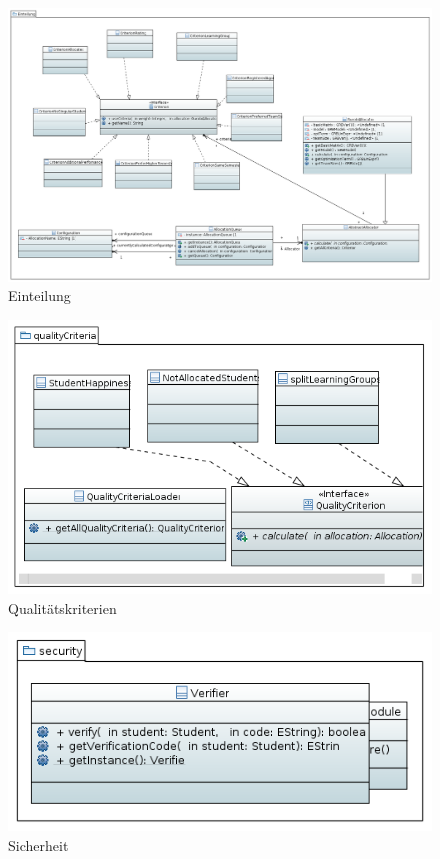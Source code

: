 \documentclass[parskip=full]{scrartcl}
\begin{document}
\begin{figure}
\centering
\includegraphics[width=\linewidth]{bilder/einteilung.png}
\caption{Einteilung}
\label{uml:allocation}
\end{figure}

\begin{figure}[!htb]
\centering
\includegraphics[width=\linewidth]{bilder/qualityCriteria.png}
\caption{Qualitätskriterien}
\label{uml:qualityCriteria}
\end{figure}

\begin{figure}[!htb]
\centering
\includegraphics[width=\linewidth]{bilder/security.png}
\caption{Sicherheit}
\label{uml:Sicherheit}
\end{figure}
\end{document}
